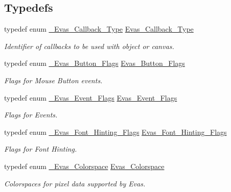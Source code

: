 \subsection*{Typedefs}
\begin{DoxyCompactItemize}
\item 
typedef enum \hyperlink{Evas_8h_a99e208e463a20499aabe6faac8a8cb8a}{\_\-Evas\_\-Callback\_\-Type} \hyperlink{Evas_8h_a076b2a9b2de2b2144a4193b1d12ed448}{Evas\_\-Callback\_\-Type}
\begin{DoxyCompactList}\small\item\em Identifier of callbacks to be used with object or canvas. \item\end{DoxyCompactList}\item 
typedef enum \hyperlink{Evas_8h_a9b61a9a46b5824fc358a5a8c82cda8b9}{\_\-Evas\_\-Button\_\-Flags} \hyperlink{Evas_8h_aae3a7dde94160cc18015784fb192bb2f}{Evas\_\-Button\_\-Flags}
\begin{DoxyCompactList}\small\item\em Flags for Mouse Button events. \item\end{DoxyCompactList}\item 
typedef enum \hyperlink{Evas_8h_a89ffbc5f4d2796994c8b07ef95ef3d1a}{\_\-Evas\_\-Event\_\-Flags} \hyperlink{Evas_8h_a9fda4d6d744ae16549b3765df7363f95}{Evas\_\-Event\_\-Flags}
\begin{DoxyCompactList}\small\item\em Flags for Events. \item\end{DoxyCompactList}\item 
typedef enum \hyperlink{group__Evas__Font__Group_ga49208864211c97ac1a09f03318aa253c}{\_\-Evas\_\-Font\_\-Hinting\_\-Flags} \hyperlink{group__Evas__Font__Group_gaaed9273c1705a3d2356470c60b2f5aa5}{Evas\_\-Font\_\-Hinting\_\-Flags}
\begin{DoxyCompactList}\small\item\em Flags for Font Hinting. \item\end{DoxyCompactList}\item 
typedef enum \hyperlink{group__Evas__Object__Image_ga84ff1db3d33d85c86d81dbe9046b54bb}{\_\-Evas\_\-Colorspace} \hyperlink{group__Evas__Object__Image_ga8c6e60db9c8b83b155ccea52957ff656}{Evas\_\-Colorspace}
\begin{DoxyCompactList}\small\item\em Colorspaces for pixel data supported by Evas. \item\end{DoxyCompactList}\item 

\end{DoxyCompactItemize}
